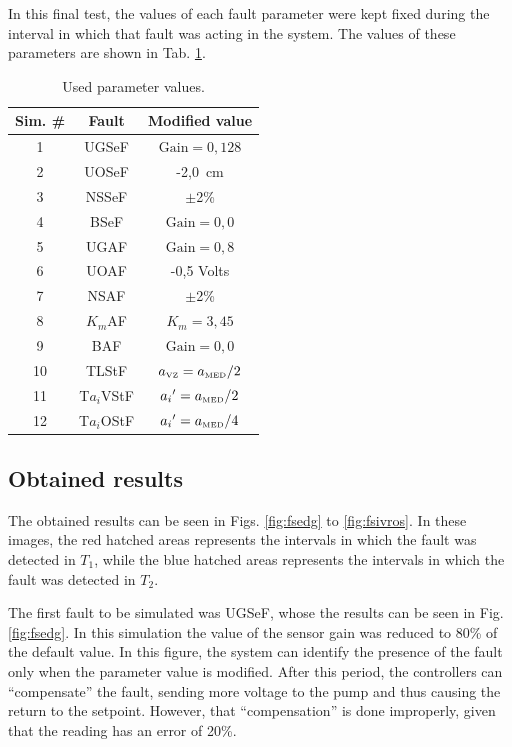 \documentclass[10pt,fleqn,a4paper]{article}
\begin{document}
In this final test, the values of each fault parameter were kept fixed during
the interval in which that fault was acting in the system. The values of these
parameters are shown in Tab. \ref{tab:used_val}.

\begin{table}[htb]
\centering
\caption{Used parameter values.}
\label{tab:used_val}
\begin{tabular}{|c|c|c|}
\hline
{\bf Sim. \#} & {\bf Fault} & {\bf Modified value}\\
\hline
1 & UGSeF & $\text{Gain} = 0,128$\\
\hline
2 & UOSeF & -2,0\ cm\\
\hline
3 & NSSeF & $\pm$2\%\\
\hline
4 & BSeF & $\text{Gain} = 0,0$\\
\hline
5 & UGAF & $\text{Gain} = 0,8$\\
\hline
6 & UOAF & -0,5 Volts\\
\hline
7 & NSAF & $\pm$2\%\\
\hline
8 & $K_m$AF & $K_m = 3,45$\\ 
\hline
9 & BAF & $\text{Gain} = 0,0$\\
\hline
10 & TLStF & $a_{\text{\tiny VZ}} = a_{\text{\tiny MED}}/2$\\
\hline
11 & T$a_i$VStF & ${a_i}' = a_{\text{\tiny MED}}/2$\\
\hline
12 & T$a_i$OStF & ${a_i}' = a_{\text{\tiny MED}}/4$\\
\hline
\end{tabular}
\end{table}

\subsection{Obtained results}
The obtained results can be seen in Figs. \ref{fig:fsedg} to \ref{fig:fsivros}.
In these images, the red hatched areas represents the intervals in which the
fault was detected in $T_1$, while the blue hatched areas represents the
intervals in which the fault was detected in $T_2$.

The first fault to be simulated was UGSeF, whose the results can be seen in Fig.
\ref{fig:fsedg}. In this simulation the value of the sensor gain was reduced to
80\% of the default value. In this figure, the system can identify the presence
of the fault only when the parameter value is modified. After this period, the
controllers can ``compensate'' the fault, sending more voltage to the pump and
thus causing the return to the setpoint. However, that ``compensation'' is done
improperly, given that the reading has an error of 20\%.
\end{document}
